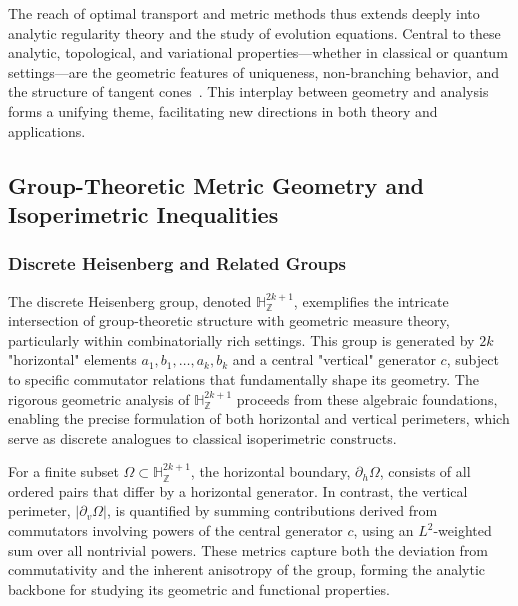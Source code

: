 \documentclass[sigconf]{acmart}
\begin{document}
\vspace{1em}
\noindent
The reach of optimal transport and metric methods thus extends deeply into analytic regularity theory and the study of evolution equations. Central to these analytic, topological, and variational properties—whether in classical or quantum settings—are the geometric features of uniqueness, non-branching behavior, and the structure of tangent cones~\cite{ref96,ref97,ref107}. This interplay between geometry and analysis forms a unifying theme, facilitating new directions in both theory and applications.

\subsection{Group-Theoretic Metric Geometry and Isoperimetric Inequalities}

\subsubsection{Discrete Heisenberg and Related Groups}

The discrete Heisenberg group, denoted $\mathbb{H}_{\mathbb{Z}}^{2k+1}$, exemplifies the intricate intersection of group-theoretic structure with geometric measure theory, particularly within combinatorially rich settings. This group is generated by $2k$ "horizontal" elements $a_1, b_1, \ldots, a_k, b_k$ and a central "vertical" generator $c$, subject to specific commutator relations that fundamentally shape its geometry. The rigorous geometric analysis of $\mathbb{H}_{\mathbb{Z}}^{2k+1}$ proceeds from these algebraic foundations, enabling the precise formulation of both horizontal and vertical perimeters, which serve as discrete analogues to classical isoperimetric constructs.

For a finite subset $\Omega \subset \mathbb{H}_{\mathbb{Z}}^{2k+1}$, the horizontal boundary, $\partial_{h}\Omega$, consists of all ordered pairs that differ by a horizontal generator. In contrast, the vertical perimeter, $|\partial_{v} \Omega|$, is quantified by summing contributions derived from commutators involving powers of the central generator $c$, using an $L^2$-weighted sum over all nontrivial powers. These metrics capture both the deviation from commutativity and the inherent anisotropy of the group, forming the analytic backbone for studying its geometric and functional properties.
\end{document}

